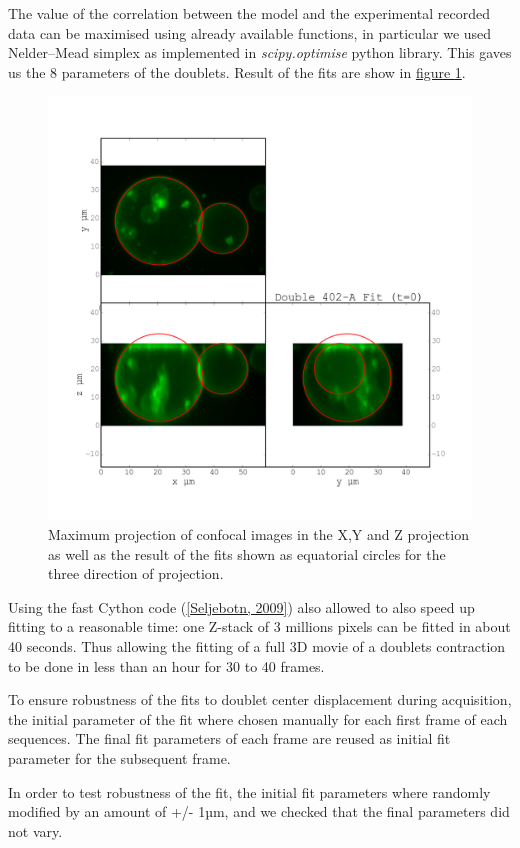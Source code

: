 \documentclass[A4paperpaper,11pt,english]{sphinxmanual}
\begin{document}
The value of the correlation between the model and the experimental recorded
data can be maximised using already available functions, in particular we used
Nelder–Mead simplex as implemented in \emph{scipy.optimise} python library. This
gaves us the 8 parameters of the doublets. Result of the fits are show in
\hyperref[parts/part4:fig-fit-t0]{figure  \ref*{parts/part4:fig-fit-t0}}.
\begin{figure}[htbp]
\centering
\capstart

\includegraphics[width=0.700\linewidth]{Doublet-402-A-Fit-t-0.png}
\caption{Maximum projection of confocal images in the X,Y and Z projection as well
as the result of the fits shown as equatorial circles for the three
direction of projection.}\label{parts/part4:fig-fit-t0}\end{figure}

Using the fast Cython code ({\hyperref[parts/part4:seljebotn2009]{{[}Seljebotn,  2009{]}}}) also allowed to also speed
up fitting to a reasonable time: one Z-stack of 3 millions pixels can be fitted
in about 40 seconds. Thus allowing the fitting of a full 3D movie of a doublets
contraction to be done in less than an hour for 30 to 40 frames.

To ensure robustness of the fits to doublet center displacement during
acquisition, the initial parameter of the fit where chosen manually for each
first frame of each sequences. The final fit parameters of each frame are reused
as initial fit parameter for the subsequent frame.

In order to test robustness of the fit, the initial fit parameters where randomly
modified by an amount of +/- 1µm, and we checked that the final parameters did
not vary.
\end{document}
